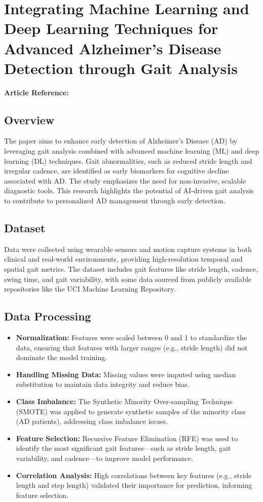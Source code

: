 \section{Integrating Machine Learning and Deep Learning Techniques for Advanced Alzheimer's Disease Detection through Gait Analysis}
\textbf{Article Reference:} \cite{article_3}

\subsection*{Overview}
The paper aims to enhance early detection of Alzheimer's Disease (AD) by leveraging gait analysis combined with advanced machine learning (ML) and deep learning (DL) techniques. Gait abnormalities, such as reduced stride length and irregular cadence, are identified as early biomarkers for cognitive decline associated with AD. The study emphasizes the need for non-invasive, scalable diagnostic tools. This research highlights the potential of AI-driven gait analysis to contribute to personalized AD management through early detection.

\subsection*{Dataset}
Data were collected using wearable sensors and motion capture systems in both clinical and real-world environments, providing high-resolution temporal and spatial gait metrics. The dataset includes gait features like stride length, cadence, swing time, and gait variability, with some data sourced from publicly available repositories like the UCI Machine Learning Repository.

\subsection*{Data Processing}
\begin{itemize}
    \item \textbf{Normalization:} Features were scaled between 0 and 1 to standardize the data, ensuring that features with larger ranges (e.g., stride length) did not dominate the model training.
    \item \textbf{Handling Missing Data:} Missing values were imputed using median substitution to maintain data integrity and reduce bias.
    \item \textbf{Class Imbalance:} The Synthetic Minority Over-sampling Technique (SMOTE) was applied to generate synthetic samples of the minority class (AD patients), addressing class imbalance issues.
    \item \textbf{Feature Selection:} Recursive Feature Elimination (RFE) was used to identify the most significant gait features—such as stride length, gait variability, and cadence—to improve model performance.
    \item \textbf{Correlation Analysis:} High correlations between key features (e.g., stride length and step length) validated their importance for prediction, informing feature selection.
\end{itemize}

